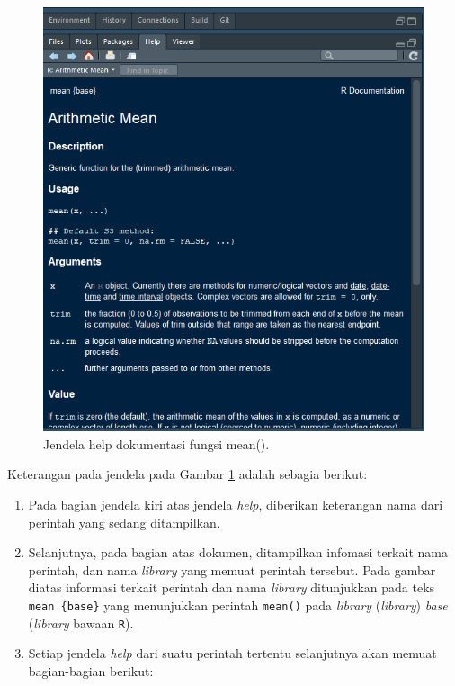 \documentclass[]{book}
\providecommand{\tightlist}{%
  \setlength{\itemsep}{0pt}\setlength{\parskip}{0pt}}
\theoremstyle{definition}
\theoremstyle{definition}
\theoremstyle{definition}
\theoremstyle{remark}
\begin{document}
\begin{figure}

{\centering \includegraphics[width=0.5\linewidth]{./images/meandoc} 

}

\caption{Jendela help dokumentasi fungsi mean().}\label{fig:meandoc}
\end{figure}

Keterangan pada jendela pada Gambar \ref{fig:meandoc} adalah sebagia berikut:

\begin{enumerate}
\def\labelenumi{\arabic{enumi}.}
\tightlist
\item
  Pada bagian jendela kiri atas jendela \emph{help}, diberikan keterangan nama dari perintah yang sedang ditampilkan.
\item
  Selanjutnya, pada bagian atas dokumen, ditampilkan infomasi terkait nama perintah, dan nama \emph{library} yang memuat perintah tersebut. Pada gambar diatas informasi terkait perintah dan nama \emph{library} ditunjukkan pada teks \texttt{mean\ \{base\}} yang menunjukkan perintah \texttt{mean()} pada \emph{library} (\emph{library}) \emph{base} (\emph{library} bawaan \texttt{R}).
\item
  Setiap jendela \emph{help} dari suatu perintah tertentu selanjutnya akan memuat bagian-bagian berikut:
\end{enumerate}
\end{document}
